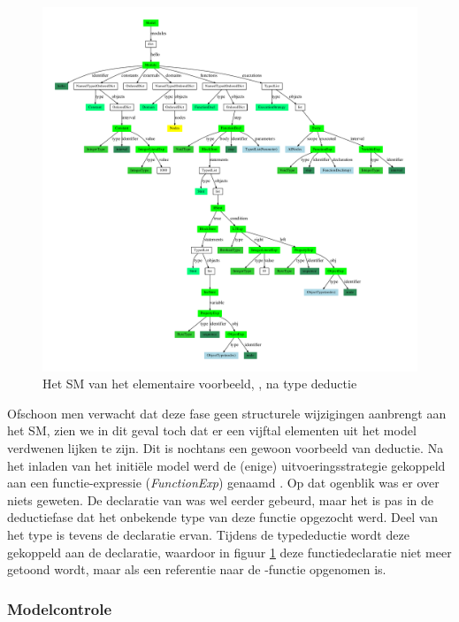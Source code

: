 \begin{figure}[ht]
  \centering
  \includegraphics[width=\linewidth]{resources/hello_sm_inferred.pdf}
  \caption{Het SM van het elementaire voorbeeld, , na type deductie}
  \label{fig:hello.sm-inferred}
\end{figure}

Ofschoon men verwacht dat deze fase geen structurele wijzigingen aanbrengt aan
het SM, zien we in dit geval toch dat er een vijftal elementen uit het model
verdwenen lijken te zijn. Dit is nochtans een gewoon voorbeeld van deductie. Na
het inladen van het initi\"ele model werd de (enige) uitvoeringsstrategie
gekoppeld aan een functie-expressie (\emph{FunctionExp}) genaamd . Op
dat ogenblik was er over  niets geweten. De declaratie van 
was wel eerder gebeurd, maar het is pas in de deductiefase dat het onbekende
type van deze functie opgezocht werd. Deel van het type is tevens de declaratie
ervan. Tijdens de typedeductie wordt deze gekoppeld aan de declaratie, waardoor
in figuur \ref{fig:hello.sm-inferred} deze functiedeclaratie niet meer getoond
wordt, maar als een referentie naar de -functie opgenomen is.

\vspace{-3mm}

\subsubsection{Modelcontrole}

